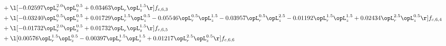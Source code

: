 \begin{alignat}{2}
& + \l[  -0.02597 \opL_r^{2.0} \opL_z^{0.5} +  0.03463 \opL_r \opL_z^{1.5}  \r] f_{c,6,3} \nonumber \\ 
& + \l[  -0.03240 \opL_r^{0.5} \opL_z^{0.5} +  0.01729 \opL_r^{1.5} \opL_z^{0.5}   -0.05546 \opL_r^{0.5} \opL_z^{1.5}   -0.03957 \opL_r^{0.5} \opL_z^{2.5}   -0.01192 \opL_r^{1.5} \opL_z^{1.5} +  0.02434 \opL_r^{2.5} \opL_z^{0.5}  \r] f_{c,6,4} \nonumber \\ 
& + \l[  -0.01732 \opL_r^{2.0} \opL_z^{0.5} +  0.01732 \opL_r \opL_z^{1.5}  \r] f_{c,6,5} \nonumber \\ 
& + \l[  0.00576 \opL_r^{1.5} \opL_z^{0.5}   -0.00397 \opL_r^{1.5} \opL_z^{1.5} +  0.01217 \opL_r^{2.5} \opL_z^{0.5}  \r] f_{c,6,6} \nonumber \\ 
\end{alignat} 


